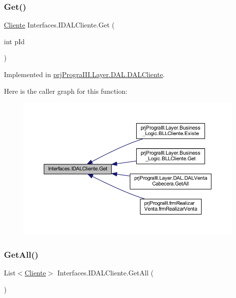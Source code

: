 \subsubsection{\texorpdfstring{Get()}{Get()}}
{\footnotesize\ttfamily \hyperlink{classprj_progra_i_i_i_1_1_layer_1_1_entities_1_1_cliente}{Cliente} Interfaces.\+I\+D\+A\+L\+Cliente.\+Get (\begin{DoxyParamCaption}\item[{int}]{p\+Id }\end{DoxyParamCaption})}



Implemented in \hyperlink{classprj_progra_i_i_i_1_1_layer_1_1_d_a_l_1_1_d_a_l_cliente_a4012b382e3da25b5300a46f05a81efb3}{prj\+Progra\+I\+I\+I.\+Layer.\+D\+A\+L.\+D\+A\+L\+Cliente}.

Here is the caller graph for this function\+:
\nopagebreak
\begin{figure}[H]
\begin{center}
\leavevmode
\includegraphics[width=350pt]{interface_interfaces_1_1_i_d_a_l_cliente_a73ffe691596e644e3b87f7685dc19e42_icgraph}
\end{center}
\end{figure}
\hypertarget{interface_interfaces_1_1_i_d_a_l_cliente_ac6adab4e78fae5e2bb08bff403d83fe7}{}\label{interface_interfaces_1_1_i_d_a_l_cliente_ac6adab4e78fae5e2bb08bff403d83fe7} 
\subsubsection{\texorpdfstring{Get\+All()}{GetAll()}}
{\footnotesize\ttfamily List$<$\hyperlink{classprj_progra_i_i_i_1_1_layer_1_1_entities_1_1_cliente}{Cliente}$>$ Interfaces.\+I\+D\+A\+L\+Cliente.\+Get\+All (\begin{DoxyParamCaption}{ }\end{DoxyParamCaption})}



